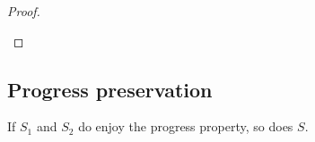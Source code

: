 \begin{proof}
\begin{description}
\begin{description}

\end{description}


\end{description}
\end{proof}
 
 
 
 
 
 
 


\subsection{Progress preservation}

\begin{proposition}%
\label{lem:restrRS}
If $S_1$ and $S_2$ do enjoy the progress property, so does $S$. 
\end{proposition}

